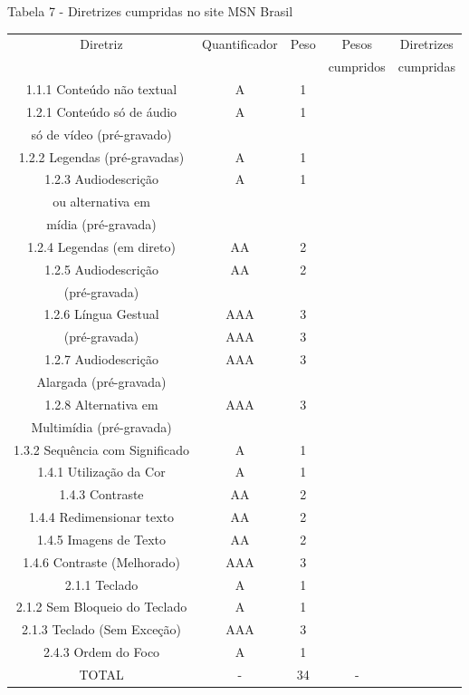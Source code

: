 \documentclass[a4paper]{article}
\begin{document}
\begin{titlepage}
Tabela 7 - Diretrizes cumpridas no site MSN Brasil\\[-1cm]
\begin{center}
	\fontsize{8pt}{8pt}\selectfont	
	\begin{longtable}{|c|c|c|c|c|}
		\hline
		Diretriz & Quantificador & Peso & Pesos & Diretrizes\\
		& & & cumpridos & cumpridas\\
		\hline
		1.1.1 Conteúdo não textual & A & 1 & & \\
		\hline
		1.2.1 Conteúdo só de áudio & A & 1 & & \\
		só de vídeo (pré-gravado) & & & & \\
		\hline
		1.2.2 Legendas (pré-gravadas) & A & 1 & & \\
		\hline
		1.2.3 Audiodescrição & A & 1 & & \\
		ou alternativa em & & & & \\
		mídia (pré-gravada) & & & & \\
		\hline
		1.2.4 Legendas (em direto) & AA & 2 & & \\
		\hline
		1.2.5 Audiodescrição & AA & 2 & & \\
		(pré-gravada) & & & & \\
		\hline
		1.2.6 Língua Gestual & AAA & 3 & & \\
		(pré-gravada) & AAA & 3 & & \\
		\hline
		1.2.7 Audiodescrição & AAA & 3 & & \\
		Alargada (pré-gravada) & & & & \\
		\hline
		1.2.8 Alternativa em & AAA & 3 & & \\
		Multimídia (pré-gravada) & & & & \\
		\hline
		1.3.2 Sequência com Significado & A & 1 & & \\
		\hline
		1.4.1 Utilização da Cor & A & 1 & & \\
		\hline
		1.4.3 Contraste & AA & 2 & & \\
		\hline
		1.4.4 Redimensionar texto & AA & 2 & & \\
		\hline
		1.4.5 Imagens de Texto & AA & 2 & & \\
		\hline
		1.4.6 Contraste (Melhorado) & AAA & 3 & & \\
		\hline
		2.1.1 Teclado & A & 1 & & \\
		\hline
		2.1.2 Sem Bloqueio do Teclado & A & 1 & & \\
		\hline
		2.1.3 Teclado (Sem Exceção) & AAA & 3 & & \\
		\hline
		2.4.3 Ordem do Foco & A & 1 & & \\
		\hline
		TOTAL & - & 34 & - & \\
		\hline
	\end{longtable}
\end{center}


\end{titlepage}
\end{document}
